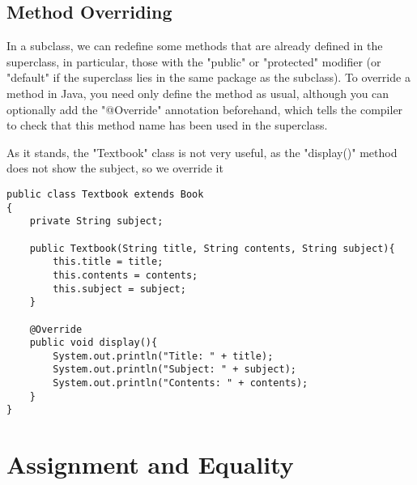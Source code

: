 \documentclass[11pt]{report}
\begin{document}
\subsection{Method Overriding}
In a subclass, we can redefine some methods that are already defined in the superclass, in particular, those with the \inlineJava"public" or \inlineJava"protected" modifier (or \inlineJava"default" if the superclass lies in the same package as the subclass). To override a method in Java, you need only define the method as usual, although you can optionally add the \inlineJava"@Override" annotation beforehand, which tells the compiler to check that this method name has been used in the superclass.
\begin{eg}
    As it stands,  the \inlineJava"Textbook" class is not very useful, as the \inlineJava"display()" method does not show the subject, so we override it
\begin{lstlisting}[caption = Textbook, label=lst:Textbook2]
public class Textbook extends Book
{
    private String subject;

    public Textbook(String title, String contents, String subject){
        this.title = title;
        this.contents = contents;
        this.subject = subject;
    }

    @Override
    public void display(){
        System.out.println("Title: " + title);
        System.out.println("Subject: " + subject);
        System.out.println("Contents: " + contents);
    }
}
\end{lstlisting}
\end{eg}

\pagebreak
\section{Assignment and Equality}
\end{document}
